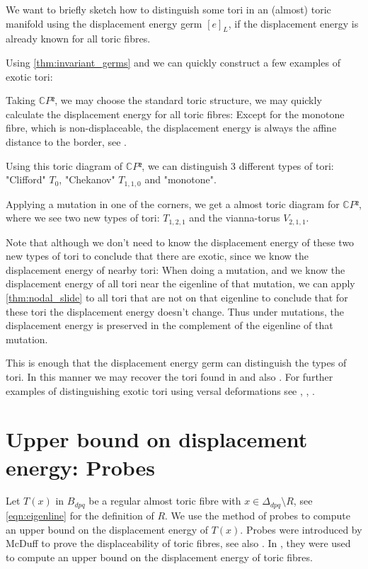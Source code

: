 \documentclass[12pt,a4paper,draft]{scrartcl}
\begin{document}
We want to briefly sketch how to distinguish some tori in an (almost) toric manifold using the displacement energy germ $[e]_L$, if the displacement energy is already known for all toric fibres.

Using \cref{thm:invariant_germs} and  we can quickly construct a few examples of exotic tori:

Taking $ℂP²$, we may choose the standard toric structure, we may quickly calculate the displacement energy for all toric fibres: Except for the monotone fibre, which is non-displaceable, the displacement energy is always the affine distance to the border, see .

Using this toric diagram of $ℂP²$, we can distinguish 3 different types of tori: "Clifford" $T_{0}$, "Chekanov" $T_{1,1,0}$ and "monotone".

Applying a mutation in one of the corners, we get a almost toric diagram for $ℂP²$, where we see two new types of tori: $T_{1,2,1}$ and the vianna-torus $V_{2,1,1}$.

Note that although we don't need to know the displacement energy of these two new types of tori to conclude that there are exotic, since we know the displacement energy of nearby tori:
When doing a mutation, and we know the displacement energy of all tori near the eigenline of that mutation, we can apply \cref{thm:nodal_slide} to all tori that are not on that eigenline to conclude that for these tori the displacement energy doesn't change.
Thus under mutations, the displacement energy is preserved in the complement of the eigenline of that mutation.

This is enough that the displacement energy germ can distinguish the types of tori. In this manner we may recover the tori found in \cite{Via16} and also \cite{Via17}. For further examples of distinguishing exotic tori using versal deformations see \cite{brendel2020real}, \cite{brendel2023hamiltonian}, \cite{brendel2023local}.

\section{Upper bound on displacement energy: Probes}
\label{sec:upper_bound}

Let $T(x)$ in $B_{dpq}$ be a regular almost toric fibre with $x \in \Delta_{dpq} \setminus R$, see \eqref{eqn:eigenline} for the definition of $R$. We use the method of probes to compute an upper bound on the displacement energy of $T(x)$. Probes were introduced by McDuff \cite{mcduff2011displacing} to prove the displaceability of toric fibres, see also \cite{AbrBorMcD14}. In \cite{brendel2020real}, they were used to compute an upper bound on the displacement energy of toric fibres.
\end{document}
